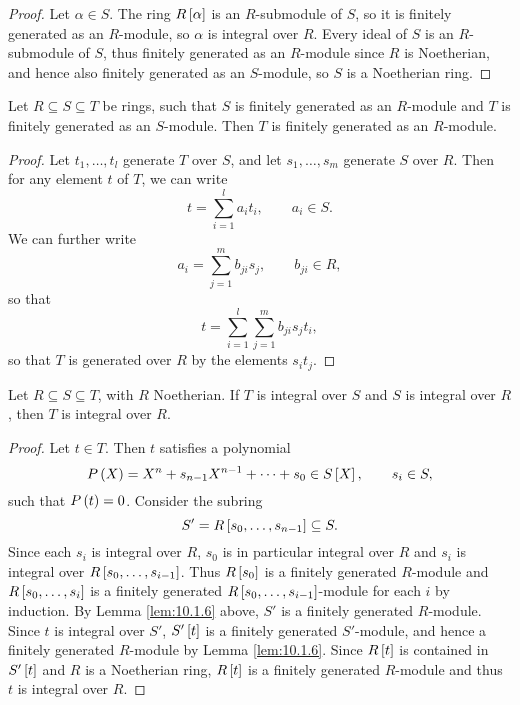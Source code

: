 \begin{proof}
Let $ \alpha \in S $. The ring $ R\sb{\alpha} $ is an $ R $-submodule of $ S $, so it is finitely generated as an $ R $-module, so $ \alpha $ is integral over $ R $. Every ideal of $ S $ is an $ R $-submodule of $ S $, thus finitely generated as an $ R $-module since $ R $ is Noetherian, and hence also finitely generated as an $ S $-module, so $ S $ is a Noetherian ring.
\end{proof}

\begin{lemma}
\label{lem:10.1.6}
Let $ R \subseteq S \subseteq T $ be rings, such that $ S $ is finitely generated as an $ R $-module and $ T $ is finitely generated as an $ S $-module. Then $ T $ is finitely generated as an $ R $-module.
\end{lemma}

\begin{proof}
Let $ t_1, \dots, t_l $ generate $ T $ over $ S $, and let $ s_1, \dots, s_m $ generate $ S $ over $ R $. Then for any element $ t $ of $ T $, we can write
$$ t = \sum_{i = 1}^l a_it_i, \qquad a_i \in S. $$
We can further write
$$ a_i = \sum_{j = 1}^m b_{ji}s_j, \qquad b_{ji} \in R, $$
so that
$$ t = \sum_{i = 1}^l \sum_{j = 1}^m b_{ji}s_jt_i, $$
so that $ T $ is generated over $ R $ by the elements $ s_it_j $.
\end{proof}

\begin{corollary}
Let $ R \subseteq S \subseteq T $, with $ R $ Noetherian. If $ T $ is integral over $ S $ and $ S $ is integral over $ R $, then $ T $ is integral over $ R $.
\end{corollary}

\begin{proof}
Let $ t \in T $. Then $ t $ satisfies a polynomial
$$ P\rb{X} = X^n + s_{n - 1}X^{n - 1} + \dots + s_0 \in S\sb{X}, \qquad s_i \in S, $$
such that $ P\rb{t} = 0 $. Consider the subring
$$ S' = R\sb{s_0, \dots, s_{n - 1}} \subseteq S. $$
Since each $ s_i $ is integral over $ R $, $ s_0 $ is in particular integral over $ R $ and $ s_i $ is integral over $ R\sb{s_0, \dots, s_{i - 1}} $. Thus $ R\sb{s_0} $ is a finitely generated $ R $-module and $ R\sb{s_0, \dots, s_i} $ is a finitely generated $ R\sb{s_0, \dots, s_{i - 1}} $-module for each $ i $ by induction. By Lemma \ref{lem:10.1.6} above, $ S' $ is a finitely generated $ R $-module. Since $ t $ is integral over $ S' $, $ S'\sb{t} $ is a finitely generated $ S' $-module, and hence a finitely generated $ R $-module by Lemma \ref{lem:10.1.6}. Since $ R\sb{t} $ is contained in $ S'\sb{t} $ and $ R $ is a Noetherian ring, $ R\sb{t} $ is a finitely generated $ R $-module and thus $ t $ is integral over $ R $.
\end{proof}

